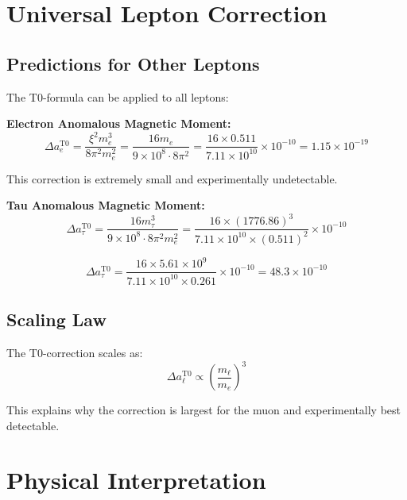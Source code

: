 \documentclass[12pt,a4paper]{report}
\newcommand{\xipar}{\xi}      %
\begin{document}
	\section{Universal Lepton Correction}\label{sec:universal_lepton_correction}
	
	\subsection{Predictions for Other Leptons}\label{subsec:other_leptons}
	
	The T0-formula can be applied to all leptons:
	
	\textbf{Electron Anomalous Magnetic Moment:}
	\begin{equation}
		\Delta a_e^{\text{T0}} = \frac{\xipar^2 m_e^3}{8\pi^2 m_e^2} = \frac{16 m_e}{9 \times 10^8 \cdot 8\pi^2} = \frac{16 \times 0.511}{7.11 \times 10^{10}} \times 10^{-10} = 1.15 \times 10^{-19}
	\end{equation}
	
	This correction is extremely small and experimentally undetectable.
	
	\textbf{Tau Anomalous Magnetic Moment:}
	\begin{equation}
		\Delta a_\tau^{\text{T0}} = \frac{16 m_\tau^3}{9 \times 10^8 \cdot 8\pi^2 m_e^2} = \frac{16 \times (1776.86)^3}{7.11 \times 10^{10} \times (0.511)^2} \times 10^{-10}
	\end{equation}
	
	\begin{equation}
		\Delta a_\tau^{\text{T0}} = \frac{16 \times 5.61 \times 10^9}{7.11 \times 10^{10} \times 0.261} \times 10^{-10} = 48.3 \times 10^{-10}
	\end{equation}
	
	\subsection{Scaling Law}\label{subsec:scaling_law}
	
	The T0-correction scales as:
	\begin{equation}
		\Delta a_\ell^{\text{T0}} \propto \left(\frac{m_\ell}{m_e}\right)^3
	\end{equation}
	
	This explains why the correction is largest for the muon and experimentally best detectable.
	
	\section{Physical Interpretation}\label{sec:physical_interpretation}
	
\end{document}
